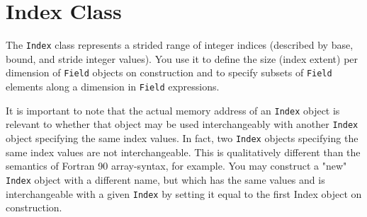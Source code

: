 \chapter{Index Class}
\label{sec:index}
The \texttt{Index} class represents a strided range of integer indices (described by base, bound, and stride integer values). 
You use it to define the size (index extent) per dimension of \texttt{Field} objects on construction and to specify subsets of 
\texttt{Field} elements along a dimension in \texttt{Field} expressions.
 
It is important to note that the actual memory address of an \texttt{Index} object is relevant to whether that object may be used 
interchangeably with another \texttt{Index} object specifying the same index values. In fact, two \texttt{Index} objects specifying 
the same index values are not interchangeable. This is qualitatively different than the semantics of Fortran 90 array-syntax, 
for example. You may construct a "new" \texttt{Index} object with a different name, but which has the same values and 
is interchangeable with a given \texttt{Index} by setting it equal to the first Index object on construction. 
